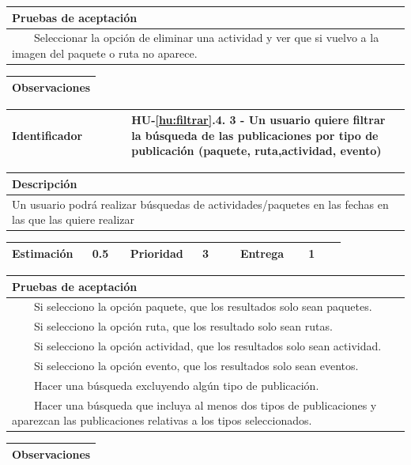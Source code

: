 \documentclass[11pt]{article}
\newcommand{\tabitem}{~~\llap{\textbullet}~~}
\begin{document}
\begin{longtable}{p{1.028\linewidth}}
	\textbf{Pruebas de aceptación}\\
	\midrule
	\tabitem Seleccionar la opción de eliminar una actividad y ver que si vuelvo a la imagen del paquete o ruta no aparece.\\
\end{longtable}
\begin{longtable}{p{1.028\linewidth}}
	\textbf{Observaciones}\\
	\midrule
	\bottomrule
	\bottomrule
\end{longtable}

\centering
\begin{longtable}{p{0.3\linewidth}|p{0.7\linewidth}}
	\toprule
	\toprule
	\textbf{Identificador} & \textbf{HU-\ref{hu:filtrar}.4}. 3 - Un usuario quiere filtrar la búsqueda de las publicaciones por tipo de publicación (paquete, ruta,actividad, evento)\\
	
	\bottomrule
\end{longtable}

\begin{longtable}{p{1.028\linewidth}}
	\textbf{Descripción}\\
	\midrule
	Un usuario podrá realizar búsquedas de actividades/paquetes en las fechas en las que las quiere realizar
\end{longtable}
\begin{longtable}{p{0.18\linewidth}|p{0.1\linewidth}|p{0.18\linewidth}|p{0.1\linewidth}|p{0.18\linewidth}|p{0.1\linewidth}}
	\toprule
	\textbf{Estimación} & 0.5 & \textbf{Prioridad} & 3 & \textbf{Entrega} & 1 \\
	\bottomrule
\end{longtable}

\begin{longtable}{p{1.028\linewidth}}
	\textbf{Pruebas de aceptación}\\
	\midrule
	\tabitem Si selecciono la opción paquete, que los resultados solo sean paquetes.\\
	\tabitem Si selecciono la opción ruta, que los resultado solo sean rutas.\\
	\tabitem Si selecciono la opción actividad, que los resultados solo sean actividad.\\
	\tabitem Si selecciono la opción evento, que los resultados solo sean eventos.\\
	\tabitem Hacer una búsqueda excluyendo algún tipo de publicación.\\
	\tabitem Hacer una búsqueda que incluya al menos dos tipos de publicaciones y aparezcan las publicaciones relativas a los tipos seleccionados.\\
\end{longtable}
\begin{longtable}{p{1.028\linewidth}}
	\textbf{Observaciones}\\
	\midrule
	\bottomrule
	\bottomrule
\end{longtable}
\end{document}

